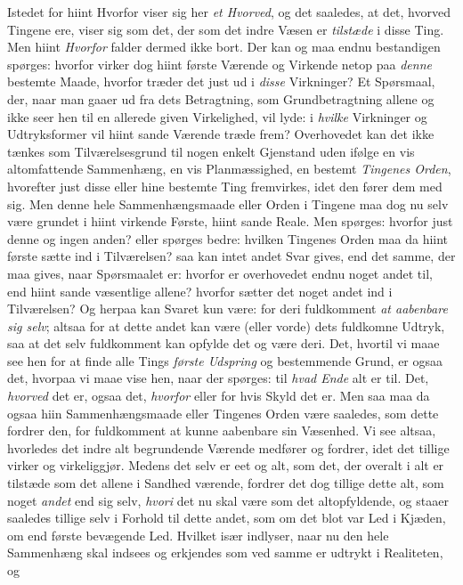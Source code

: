 \documentclass[12pt,a4paper]{book}
\newcommand{\apage}[1]{\marginnote{\footnotesize\textit{[#1]}}}
\begin{document}
Istedet for hiint Hvorfor viser sig her \emph{et Hvorved}, og det saaledes, at
det, hvorved Tingene ere, viser sig som det, der som det indre Væsen er
\emph{tilstæde} i disse Ting. Men hiint \emph{Hvorfor} falder dermed ikke bort.
Der kan og maa endnu bestandigen spørges: hvorfor virker dog hiint første Værende
og Virkende netop paa \emph{denne} bestemte Maade, hvorfor træder det just ud i
\emph{disse} Virkninger? Et Spørsmaal, der, naar man gaaer ud fra dets
Betragtning, som Grundbetragtning allene og ikke seer hen til en allerede given
Virkelighed, vil lyde: i \emph{hvilke} Virkninger og Udtryksformer vil hiint sande
Værende træde frem? Overhovedet kan det ikke tænkes som  \apage{107} Tilværelsesgrund til nogen
enkelt Gjenstand uden ifølge en vis altomfattende Sammenhæng, en vis
Planmæssighed, en bestemt \emph{Tingenes Orden}, hvorefter just disse eller hine
bestemte Ting fremvirkes, idet den fører dem med sig. Men denne hele
Sammenhængsmaade eller Orden i Tingene maa dog nu selv være grundet i hiint
virkende Første, hiint sande Reale. Men spørges: hvorfor just denne og ingen
anden? eller spørges bedre: hvilken Tingenes Orden maa da hiint første sætte ind i
Tilværelsen? saa kan intet andet Svar gives, end det samme, der maa gives, naar
Spørsmaalet er: hvorfor er overhovedet endnu noget andet til, end hiint sande
væsentlige allene? hvorfor sætter det noget andet ind i Tilværelsen? Og herpaa
kan Svaret kun være: for deri fuldkomment \emph{at aabenbare sig selv}; altsaa for
at dette andet kan være (eller vorde) dets fuldkomne Udtryk, saa at det selv
fuldkomment kan opfylde det og være deri. Det, hvortil vi maae see hen for at
finde alle Tings \emph{første Udspring} og bestemmende Grund, er ogsaa det, hvorpaa
vi maae vise hen, naar der spørges: til \emph{hvad Ende} alt er til. Det,
\emph{hvorved} det er, ogsaa det, \emph{hvorfor} eller for hvis Skyld det er. Men
saa maa da ogsaa hiin Sammenhængsmaade eller Tingenes Orden være saaledes, som
dette fordrer den, for fuldkomment at kunne aabenbare sin Væsenhed. Vi see altsaa,
hvorledes det indre alt begrundende \apage{108}  Værende medfører og fordrer, idet det tillige
virker og virkeliggjør. Medens det selv er eet og alt, som det, der overalt i alt
er tilstæde som det allene i Sandhed værende, fordrer det dog tillige dette alt,
som noget \emph{andet} end sig selv, \emph{hvori} det nu skal være som det altopfyldende,
og staaer saaledes tillige selv i Forhold til dette andet, som om det blot var Led
i Kjæden, om end første bevægende Led. Hvilket især indlyser, naar nu den hele
Sammenhæng skal indsees og erkjendes som ved samme er udtrykt i Realiteten, og
\end{document}
